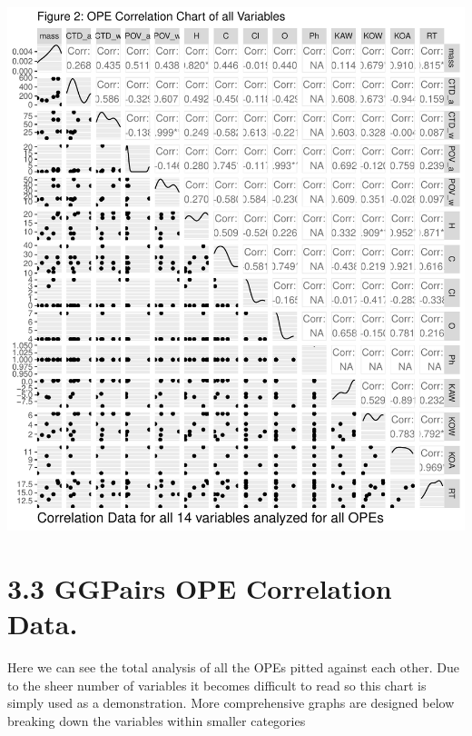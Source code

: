 \documentclass[journal=jacsat,manuscript=article]{achemso}
\begin{document}
\includegraphics{Rahmi_Chowdhury_500621744_Final_project_files/figure-latex/unnamed-chunk-4-1.pdf}

\hypertarget{ggpairs-ope-correlation-data.}{%
\section{3.3 GGPairs OPE Correlation
Data.}\label{ggpairs-ope-correlation-data.}}

Here we can see the total analysis of all the OPEs pitted against each
other. Due to the sheer number of variables it becomes difficult to read
so this chart is simply used as a demonstration. More comprehensive
graphs are designed below breaking down the variables within smaller
categories
\end{document}
